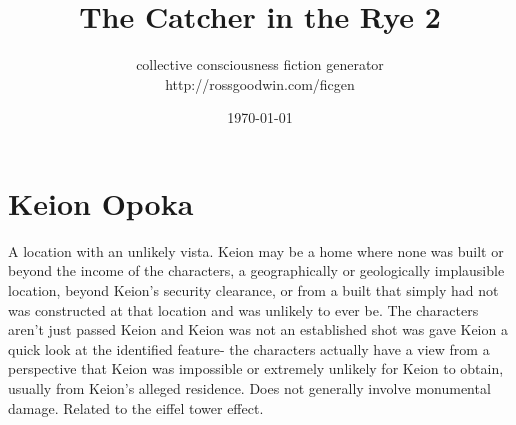 \documentclass[12pt]{book}
\title{The Catcher in the Rye 2}
\author{collective consciousness fiction generator\\http://rossgoodwin.com/ficgen}
\date{\today}
\begin{document}
\maketitle



\chapter{Keion Opoka}

A location with an unlikely vista. Keion may be a home where none was built or beyond the income of the characters, a geographically or geologically implausible location, beyond Keion's security clearance, or from a built that simply had not was constructed at that location and was unlikely to ever be. The characters aren't just passed Keion and Keion was not an established shot was gave Keion a quick look at the identified feature- the characters actually have a view from a perspective that Keion was impossible or extremely unlikely for Keion to obtain, usually from Keion's alleged residence. Does not generally involve monumental damage. Related to the eiffel tower effect.
\end{document}
